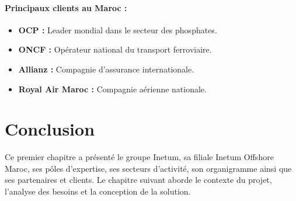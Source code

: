 \paragraph{Principaux clients au Maroc :}
\begin{itemize}
    \setlength\itemsep{0.1em}  %
    \setlength\parskip{0pt}    %
    \setlength\parsep{0pt}
    \item \textbf{OCP :} Leader mondial dans le secteur des phosphates.
    \item \textbf{ONCF :} Opérateur national du transport ferroviaire.
    \item \textbf{Allianz :} Compagnie d’assurance internationale.
    \item \textbf{Royal Air Maroc :} Compagnie aérienne nationale.
\end{itemize}

\section*{Conclusion}
Ce premier chapitre a présenté le groupe Inetum, sa filiale Inetum Offshore Maroc, ses pôles d'expertise, ses secteurs d'activité, son organigramme ainsi que ses partenaires et clients. Le chapitre suivant aborde le contexte du projet, l'analyse des besoins et la conception de la solution.
